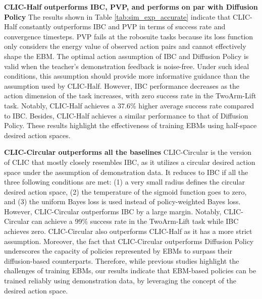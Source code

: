 \textbf{CLIC-Half outperforms IBC, PVP, and performs on par with Diffusion Policy} 
The results shown in Table \ref{tab:sim_exp_accurate} indicate that CLIC-Half constantly outperforms IBC and PVP in terms of success rate and convergence timesteps. 
PVP fails at the robosuite tasks because its loss function only considers the energy value of observed action pairs and cannot effectively shape the EBM. 
The optimal action assumption of IBC and Diffusion Policy is valid when the teacher's demonstration feedback is noise-free.
Under such ideal conditions, this assumption should provide more informative guidance than the assumption used by CLIC-Half.
However, IBC performance decreases as the action dimension of the task increases, with zero success rate in the TwoArm-Lift task. 
Notably, CLIC-Half achieves a $37.6 \%$ higher average success rate compared to IBC. 
Besides, CLIC-Half achieves a similar performance to that of Diffusion Policy.
These results highlight the effectiveness of training EBMs using half-space desired action spaces.



 


\textbf{CLIC-Circular outperforms all the baselines} 
CLIC-Circular is the version of CLIC that mostly closely resembles IBC, as it utilizes a circular desired action space under the assumption of demonstration data. 
It reduces to IBC if all the three following conditions are met: (1) a very small radius defines the circular desired action space, (2) the temperature of the sigmoid function goes to zero, and (3) the uniform Bayes loss is used instead of policy-weighted Bayes loss.
However, CLIC-Circular outperforms IBC by a large margin. Notably,  CLIC-Circular can achieve a 99$\%$ success rate in the TwoArm-Lift task while IBC achieves zero.
CLIC-Circular also outperforms CLIC-Half as it has a more strict assumption. 
Moreover, the fact that CLIC-Circular outperforms Diffusion Policy underscores the capacity of policies represented by EBMs to surpass their diffusion-based counterparts.
Therefore, while previous studies \cite{2022_arxiv_IBC_gaps, 2023_diffusionpolicy} highlight the challenges of training EBMs, our results indicate that EBM-based policies can be trained reliably using demonstration data, by leveraging the concept of the desired action space.






